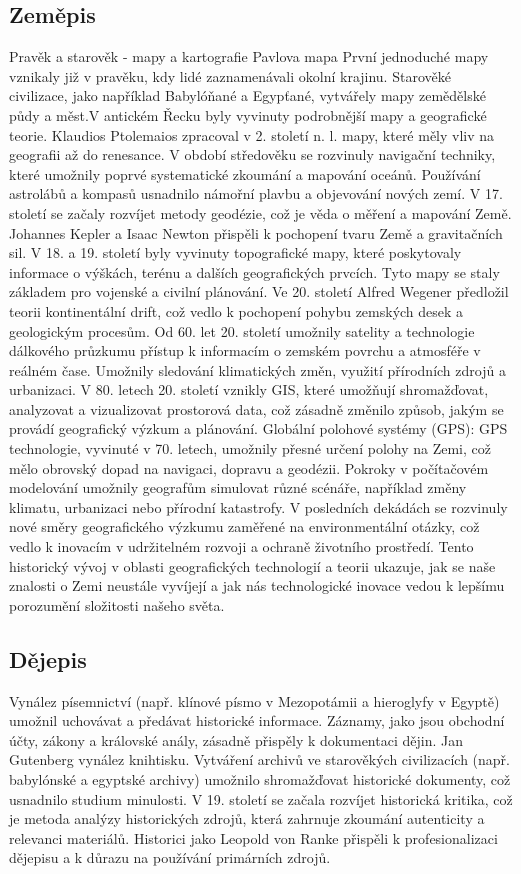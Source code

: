 \documentclass[a4paper,12pt,twoside,FP]{article}
\begin{document}
\subsection{Zeměpis}
Pravěk a starověk - mapy a kartografie Pavlova mapa 
První jednoduché mapy vznikaly již v pravěku, kdy lidé zaznamenávali okolní krajinu. Starověké civilizace, jako například Babylóňané a Egypťané, vytvářely mapy zemědělské půdy a měst.V antickém Řecku byly vyvinuty podrobnější mapy a geografické teorie. Klaudios Ptolemaios zpracoval v 2. století n. l. mapy, které měly vliv na geografii až do renesance. V období středověku se rozvinuly navigační techniky, které umožnily poprvé systematické zkoumání a mapování oceánů. Používání astrolábů a kompasů usnadnilo námořní plavbu a objevování nových zemí. V 17. století se začaly rozvíjet metody geodézie, což je věda o měření a mapování Země. Johannes Kepler a Isaac Newton přispěli k pochopení tvaru Země a gravitačních sil. V 18. a 19. století byly vyvinuty topografické mapy, které poskytovaly informace o výškách, terénu a dalších geografických prvcích. Tyto mapy se staly základem pro vojenské a civilní plánování. Ve 20. století Alfred Wegener předložil teorii kontinentální drift, což vedlo k pochopení pohybu zemských desek a geologickým procesům. Od 60. let 20. století umožnily satelity a technologie dálkového průzkumu přístup k informacím o zemském povrchu a atmosféře v reálném čase. Umožnily sledování klimatických změn, využití přírodních zdrojů a urbanizaci. V 80. letech 20. století vznikly GIS, které umožňují shromažďovat, analyzovat a vizualizovat prostorová data, což zásadně změnilo způsob, jakým se provádí geografický výzkum a plánování. Globální polohové systémy (GPS): GPS technologie, vyvinuté v 70. letech, umožnily přesné určení polohy na Zemi, což mělo obrovský dopad na navigaci, dopravu a geodézii. Pokroky v počítačovém modelování umožnily geografům simulovat různé scénáře, například změny klimatu, urbanizaci nebo přírodní katastrofy. V posledních dekádách se rozvinuly nové směry geografického výzkumu zaměřené na environmentální otázky, což vedlo k inovacím v udržitelném rozvoji a ochraně životního prostředí. Tento historický vývoj v oblasti geografických technologií a teorii ukazuje, jak se naše znalosti o Zemi neustále vyvíjejí a jak nás technologické inovace vedou k lepšímu porozumění složitosti našeho světa.


\subsection{Dějepis}
Vynález písemnictví (např. klínové písmo v Mezopotámii a hieroglyfy v Egyptě) umožnil uchovávat a předávat historické informace. Záznamy, jako jsou obchodní účty, zákony a královské anály, zásadně přispěly k dokumentaci dějin. Jan Gutenberg vynález knihtisku. Vytváření archivů ve starověkých civilizacích (např. babylónské a egyptské archivy) umožnilo shromažďovat historické dokumenty, což usnadnilo studium minulosti. V 19. století se začala rozvíjet historická kritika, což je metoda analýzy historických zdrojů, která zahrnuje zkoumání autenticity a relevanci materiálů. Historici jako Leopold von Ranke přispěli k profesionalizaci dějepisu a k důrazu na používání primárních zdrojů.
\end{document}
